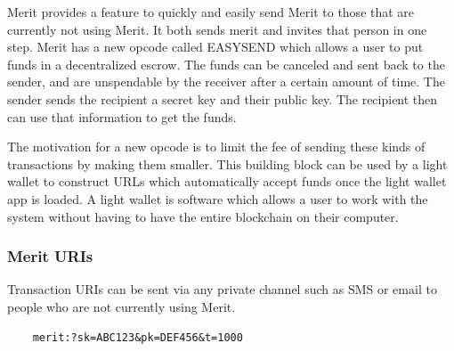 \documentclass{article}
\begin{document}
Merit provides a feature to quickly and easily send Merit to those that are
currently not using Merit.  It both sends merit and invites that person in one
step.  Merit has a new opcode called EASYSEND which allows a user to put funds 
in a decentralized escrow.  The funds can be canceled and sent back to the sender,
and are unspendable by the receiver after a certain amount of time.  The sender
sends the recipient a secret key and their public key.  The recipient then can
use that information to get the funds.

\begin{center}
\end{center}

The motivation for a new opcode is to limit the fee of sending these kinds of
transactions by making them smaller.  This building block can be used by
a light wallet to construct URLs which automatically accept funds once
the light wallet app is loaded.  A light wallet is software which allows a user
to work with the system without having to have the entire blockchain on their
computer.

\subsubsection{Merit URIs}
Transaction URIs can be sent via any private channel such as SMS or email to people
who are not currently using Merit.
   
\begin{verbatim}
    merit:?sk=ABC123&pk=DEF456&t=1000
\end{verbatim}

   
\end{document}
